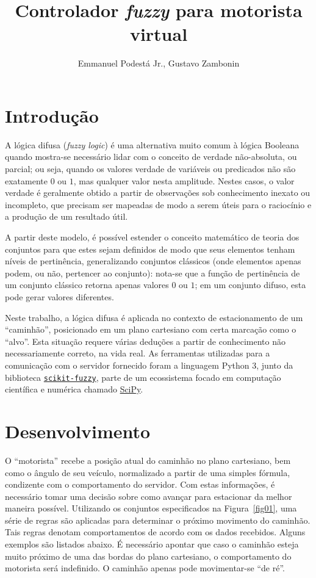 \documentclass{../../sftex/sftex}
\title{Controlador \emph{fuzzy} para motorista virtual}
\author{Emmanuel Podestá Jr., Gustavo Zambonin}
\begin{document}
\maketitle

\section{Introdução}

A lógica difusa (\emph{fuzzy logic}) é uma alternativa muito comum à lógica
Booleana quando mostra-se necessário lidar com o conceito de verdade
não-absoluta, ou parcial; ou seja, quando os valores verdade de variáveis ou
predicados não são exatamente $0$ ou $1$, mas qualquer valor nesta amplitude.
Nestes casos, o valor verdade é geralmente obtido a partir de observações sob
conhecimento inexato ou incompleto, que precisam ser mapeadas de modo a serem
úteis para o raciocínio e a produção de um resultado útil. \medskip

A partir deste modelo, é possível estender o conceito matemático de teoria dos
conjuntos para que estes sejam definidos de modo que seus elementos tenham
níveis de pertinência, generalizando conjuntos clássicos (onde elementos apenas
podem, ou não, pertencer ao conjunto): nota-se que a função de pertinência de
um conjunto clássico retorna apenas valores $0$ ou $1$; em um conjunto difuso,
esta pode gerar valores diferentes. \medskip

Neste trabalho, a lógica difusa é aplicada no contexto de estacionamento de um
``caminhão'', posicionado em um plano cartesiano com certa marcação como o
``alvo''. Esta situação requere várias deduções a partir de conhecimento
não necessariamente correto, na vida real. As ferramentas utilizadas para a
comunicação com o servidor fornecido foram a linguagem Python 3, junto da
biblioteca
\href{https://github.com/scikit-fuzzy/scikit-fuzzy}{\texttt{scikit-fuzzy}},
parte de um ecossistema focado em computação científica e
numérica chamado \href{https://scipy.org}{SciPy}.

\section{Desenvolvimento}

O ``motorista'' recebe a posição atual do caminhão no plano cartesiano, bem
como o ângulo de seu veículo, normalizado a partir de uma simples fórmula,
condizente com o comportamento do servidor. Com estas informações, é
necessário tomar uma decisão sobre como avançar para estacionar da melhor
maneira possível. Utilizando os conjuntos especificados na Figura~\ref{fig01},
uma série de regras são aplicadas para determinar o próximo movimento do
caminhão. Tais regras denotam comportamentos de acordo com os dados recebidos.
Alguns exemplos são listados abaixo. É necessário apontar que caso o caminhão
esteja muito próximo de uma das bordas do plano cartesiano, o comportamento do
motorista será indefinido. O caminhão apenas pode movimentar-se ``de ré''.
\end{document}
